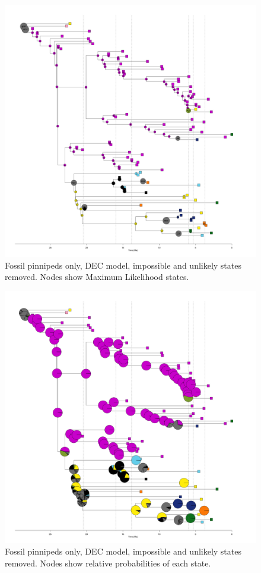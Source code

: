 \documentclass[a4paper, 12pt]{article}
\begin{document}
\begin{figure}[H]
\centering
 \includegraphics[width = \linewidth]{figures/fossil-pinnipeds-DEC-unlikely-MLstates.png}
  \caption{Fossil pinnipeds only, DEC model, impossible and unlikely states removed. Nodes show Maximum Likelihood states.}
  \label{fig-fossil-dec-ml-unlikely}
\end{figure} 

\begin{figure}[H]
 \centering
  \includegraphics[width = \linewidth]{figures/fossil-pinnipeds-DEC-unlikely-pies.png}
  \caption{Fossil pinnipeds only, DEC model, impossible and unlikely states removed. Nodes show relative probabilities of each state.}
  \label{fig-fossil-dec-pie-unlikely}
\end{figure} 
\end{document}

